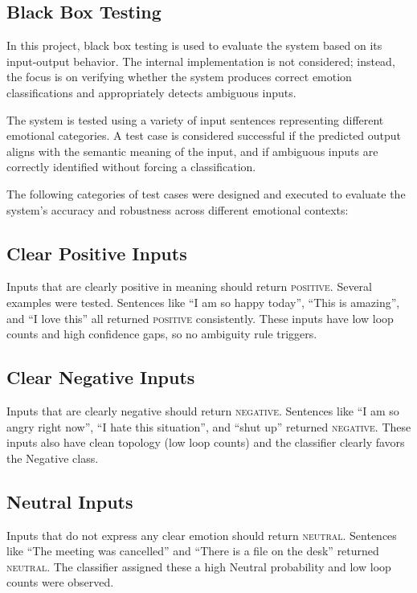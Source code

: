 \subsection{Black Box Testing}

In this project, black box testing is used to evaluate the system based on its input-output behavior. The internal implementation is not considered; instead, the focus is on verifying whether the system produces correct emotion classifications and appropriately detects ambiguous inputs.

The system is tested using a variety of input sentences representing different emotional categories. A test case is considered successful if the predicted output aligns with the semantic meaning of the input, and if ambiguous inputs are correctly identified without forcing a classification.

The following categories of test cases were designed and executed to evaluate the system's accuracy and robustness across different emotional contexts:

\subsection{Clear Positive Inputs}

Inputs that are clearly positive in meaning should return \textsc{positive}. Several examples
were tested. Sentences like ``I am so happy today'', ``This is amazing'', and ``I love this''
all returned \textsc{positive} consistently. These inputs have low loop counts and high confidence
gaps, so no ambiguity rule triggers.

\subsection{Clear Negative Inputs}

Inputs that are clearly negative should return \textsc{negative}. Sentences like ``I am so angry
right now'', ``I hate this situation'', and ``shut up'' returned \textsc{negative}. These inputs
also have clean topology (low loop counts) and the classifier clearly favors the Negative class.

\subsection{Neutral Inputs}

Inputs that do not express any clear emotion should return \textsc{neutral}. Sentences like
``The meeting was cancelled'' and ``There is a file on the desk'' returned \textsc{neutral}. The
classifier assigned these a high Neutral probability and low loop counts were observed.

